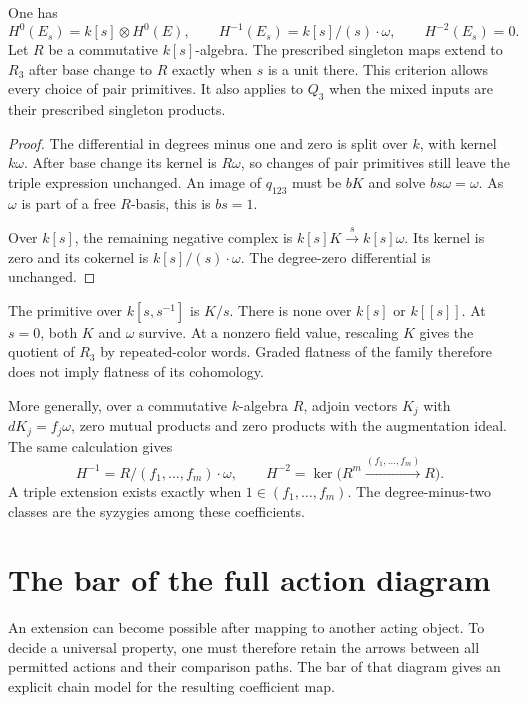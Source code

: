 \begin{proposition}\label{cbc:va:parameter-obstruction}
One has
\[
 H^0(E_s)=k[s]\otimes H^0(E),\qquad
 H^{-1}(E_s)=k[s]/(s)\cdot\omega,\qquad H^{-2}(E_s)=0.
\]
Let $R$ be a commutative $k[s]$-algebra.
The prescribed singleton maps extend to $R_3$ after
base change to $R$ exactly when $s$ is a unit there. This criterion allows every choice
of pair primitives. It also applies to $Q_3$
when the mixed inputs are their prescribed
singleton products.
\end{proposition}
\begin{proof}
The differential in degrees minus one and zero
is split over $k$, with kernel $k\omega$.
After base change its kernel is $R\omega$,
so changes of pair primitives still leave the
triple expression unchanged.
An image of $q_{123}$ must be $bK$ and solve
$bs\omega=\omega$. As $\omega$ is part of a
free $R$-basis, this is $bs=1$.

Over $k[s]$, the remaining negative complex is
$k[s]K\xrightarrow{s}k[s]\omega$.
Its kernel is zero and its cokernel is
$k[s]/(s)\cdot\omega$. The degree-zero
differential is unchanged.
\end{proof}

The primitive over $k[s,s^{-1}]$ is $K/s$.
There is none over $k[s]$ or $k[[s]]$.
At $s=0$, both $K$ and $\omega$ survive.
At a nonzero field value, rescaling $K$
gives the quotient of $R_3$ by repeated-color
words. Graded flatness of the family therefore
does not imply flatness of its cohomology.

More generally, over a commutative $k$-algebra
$R$, adjoin vectors $K_j$ with
$dK_j=f_j\omega$, zero mutual products and
zero products with the augmentation ideal.
The same calculation gives
\[
 H^{-1}=R/(f_1,\ldots,f_m)\cdot\omega,\qquad
 H^{-2}=\ker\bigl(R^m\xrightarrow{(f_1,\ldots,f_m)}R\bigr).
\]
A triple extension exists exactly when
$1\in(f_1,\ldots,f_m)$. The degree-minus-two
classes are the syzygies among these coefficients.

\section{The bar of the full action diagram}
\label{cbc:va:action-bar}

An extension can become possible after mapping
to another acting object. To decide a universal
property, one must therefore retain the arrows
between all permitted actions and their comparison
paths. The bar of that diagram gives an explicit
chain model for the resulting coefficient map.

